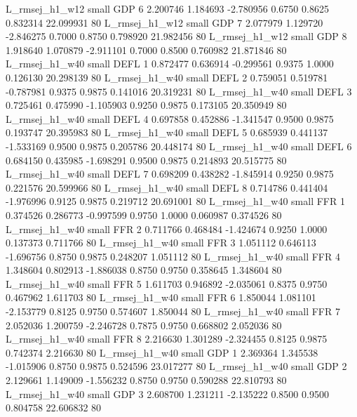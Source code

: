L_rmsej_h1_w12      small      GDP                 6 2.200746 1.184693 -2.780956 0.6750 0.8625  0.832314   22.099931 80
L_rmsej_h1_w12      small      GDP                 7 2.077979 1.129720 -2.846275 0.7000 0.8750  0.798920   21.982456 80
L_rmsej_h1_w12      small      GDP                 8 1.918640 1.070879 -2.911101 0.7000 0.8500  0.760982   21.871846 80
L_rmsej_h1_w40      small     DEFL                 1 0.872477 0.636914 -0.299561 0.9375 1.0000  0.126130   20.298139 80
L_rmsej_h1_w40      small     DEFL                 2 0.759051 0.519781 -0.787981 0.9375 0.9875  0.141016   20.319231 80
L_rmsej_h1_w40      small     DEFL                 3 0.725461 0.475990 -1.105903 0.9250 0.9875  0.173105   20.350949 80
L_rmsej_h1_w40      small     DEFL                 4 0.697858 0.452886 -1.341547 0.9500 0.9875  0.193747   20.395983 80
L_rmsej_h1_w40      small     DEFL                 5 0.685939 0.441137 -1.533169 0.9500 0.9875  0.205786   20.448174 80
L_rmsej_h1_w40      small     DEFL                 6 0.684150 0.435985 -1.698291 0.9500 0.9875  0.214893   20.515775 80
L_rmsej_h1_w40      small     DEFL                 7 0.698209 0.438282 -1.845914 0.9250 0.9875  0.221576   20.599966 80
L_rmsej_h1_w40      small     DEFL                 8 0.714786 0.441404 -1.976996 0.9125 0.9875  0.219712   20.691001 80
L_rmsej_h1_w40      small      FFR                 1 0.374526 0.286773 -0.997599 0.9750 1.0000  0.060987    0.374526 80
L_rmsej_h1_w40      small      FFR                 2 0.711766 0.468484 -1.424674 0.9250 1.0000  0.137373    0.711766 80
L_rmsej_h1_w40      small      FFR                 3 1.051112 0.646113 -1.696756 0.8750 0.9875  0.248207    1.051112 80
L_rmsej_h1_w40      small      FFR                 4 1.348604 0.802913 -1.886038 0.8750 0.9750  0.358645    1.348604 80
L_rmsej_h1_w40      small      FFR                 5 1.611703 0.946892 -2.035061 0.8375 0.9750  0.467962    1.611703 80
L_rmsej_h1_w40      small      FFR                 6 1.850044 1.081101 -2.153779 0.8125 0.9750  0.574607    1.850044 80
L_rmsej_h1_w40      small      FFR                 7 2.052036 1.200759 -2.246728 0.7875 0.9750  0.668802    2.052036 80
L_rmsej_h1_w40      small      FFR                 8 2.216630 1.301289 -2.324455 0.8125 0.9875  0.742374    2.216630 80
L_rmsej_h1_w40      small      GDP                 1 2.369364 1.345538 -1.015906 0.8750 0.9875  0.524596   23.017277 80
L_rmsej_h1_w40      small      GDP                 2 2.129661 1.149009 -1.556232 0.8750 0.9750  0.590288   22.810793 80
L_rmsej_h1_w40      small      GDP                 3 2.608700 1.231211 -2.135222 0.8500 0.9500  0.804758   22.606832 80
